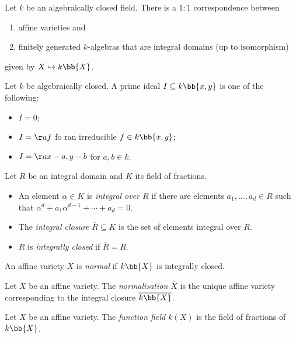 \documentclass{article}
\begin{document}
\begin{theorem}
  Let $k$ be an algebraically closed field. There is a $1:1$ correspondence
  between
  \begin{enumerate}
    \item affine varieties and
    \item finitely generated $k$-algebras that are integral domains (up to isomorphism)
  \end{enumerate}
  given by $X\mapsto k\bb{X}$.
\end{theorem}

\begin{proposition}
  Let $k$ be algebraically closed. A prime ideal $I\subseteq k\bb{x,y}$ is one of the
  following:
  \begin{itemize}
    \item $I=0$;
    \item $I=\aa{f}$ fo ran irreducible $f\in k\bb{x,y}$;
    \item $I=\aa{x-a,y-b}$ for $a,b\in k$.
  \end{itemize}
\end{proposition}

\begin{definition}
  Let $R$ be an integral domain and $K$ its field of fractions.
  \begin{itemize}
    \item An element $\alpha\in K$ is \emph{integral over $R$} if there are elements
      $a_1,\ldots,a_d\in R$ such that $\alpha^d + a_1\alpha^{d-1} +\cdots + a_d = 0$.
    \item The \emph{integral closure} $\overline R\subseteq K$ is the set of elements integral over $R$.
    \item $R$ is \emph{integrally closed} if $\overline R=R$.
  \end{itemize}
\end{definition}

\begin{definition}
  An affine variety $X$ is \emph{normal} if $k\bb{X}$ is integrally closed.
\end{definition}

\begin{definition}
  Let $X$ be an affine variety. The \emph{normalisation $\overline X$} is the unique
  affine variety corresponding to the integral closure $\overline{k\bb{X}}$.
\end{definition}

\begin{definition}
  Let $X$ be an affine variety. The \emph{function field $k(X)$} is the field of fractions of $k\bb{X}$.
\end{definition}
\end{document}
